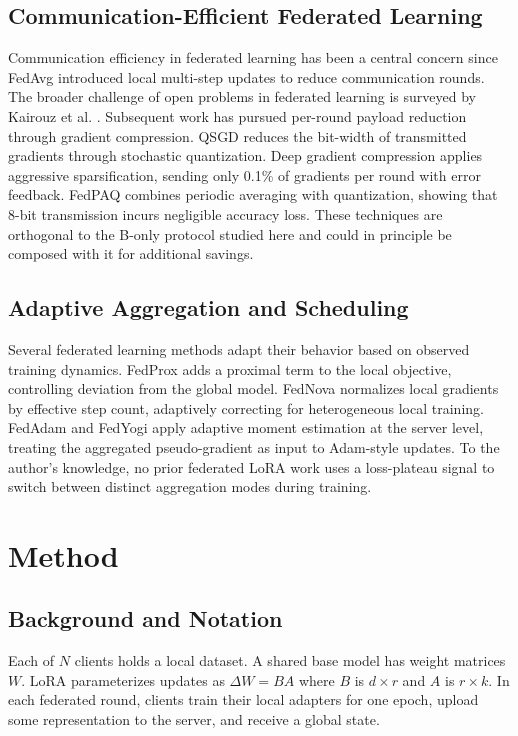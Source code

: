 \subsection{Communication-Efficient Federated Learning}
Communication efficiency in federated learning has been a central concern since FedAvg \cite{mcmahan2017communication} introduced local multi-step updates to reduce communication rounds. The broader challenge of open problems in federated learning is surveyed by Kairouz et al. \cite{kairouz2021advances}. Subsequent work has pursued per-round payload reduction through gradient compression. QSGD \cite{alistarh2017qsgd} reduces the bit-width of transmitted gradients through stochastic quantization. Deep gradient compression \cite{lin2017deep} applies aggressive sparsification, sending only 0.1\% of gradients per round with error feedback. FedPAQ \cite{reisizadeh2020fedpaq} combines periodic averaging with quantization, showing that 8-bit transmission incurs negligible accuracy loss. These techniques are orthogonal to the B-only protocol studied here and could in principle be composed with it for additional savings.

\subsection{Adaptive Aggregation and Scheduling}
Several federated learning methods adapt their behavior based on observed training dynamics. FedProx \cite{li2020fedprox} adds a proximal term to the local objective, controlling deviation from the global model. FedNova \cite{wang2020fednova} normalizes local gradients by effective step count, adaptively correcting for heterogeneous local training. FedAdam and FedYogi \cite{reddi2020adaptive} apply adaptive moment estimation at the server level, treating the aggregated pseudo-gradient as input to Adam-style updates. To the author's knowledge, no prior federated LoRA work uses a loss-plateau signal to switch between distinct aggregation modes during training.

\section{Method}
\label{sec:method}

\subsection{Background and Notation}
Each of $N$ clients holds a local dataset. A shared base model has weight matrices $W$. LoRA \cite{hu2022lora} parameterizes updates as $\Delta W = BA$ where $B$ is $d \times r$ and $A$ is $r \times k$. In each federated round, clients train their local adapters for one epoch, upload some representation to the server, and receive a global state.

